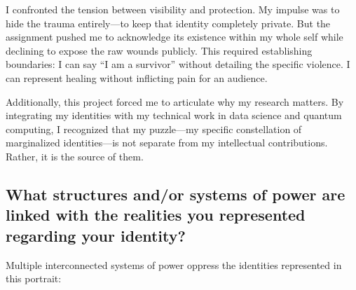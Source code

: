 \documentclass[10pt]{article}
\begin{document}
I confronted the tension between visibility and protection. My impulse was to hide the trauma entirely---to keep that identity completely private. But the assignment pushed me to acknowledge its existence within my whole self while declining to expose the raw wounds publicly. This required establishing boundaries: I can say ``I am a survivor'' without detailing the specific violence. I can represent healing without inflicting pain for an audience.

Additionally, this project forced me to articulate why my research matters. By integrating my identities with my technical work in data science and quantum computing, I recognized that my puzzle---my specific constellation of marginalized identities---is not separate from my intellectual contributions. Rather, it is the source of them.

\subsection*{What structures and/or systems of power are linked with the realities you represented regarding your identity?}

Multiple interconnected systems of power oppress the identities represented in this portrait:
\end{document}
